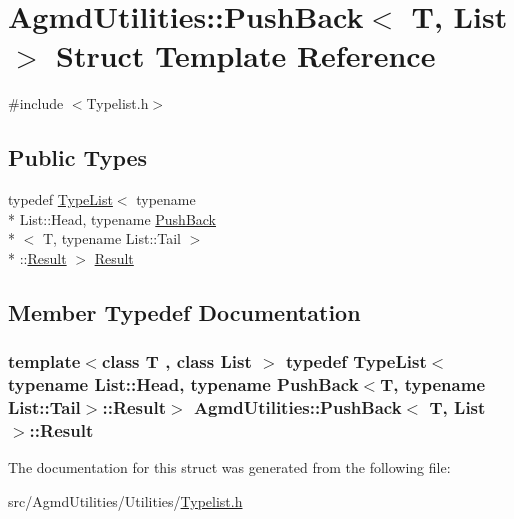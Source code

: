 \hypertarget{struct_agmd_utilities_1_1_push_back}{\section{Agmd\+Utilities\+:\+:Push\+Back$<$ T, List $>$ Struct Template Reference}
\label{struct_agmd_utilities_1_1_push_back}
}


{\ttfamily \#include $<$Typelist.\+h$>$}

\subsection*{Public Types}
\begin{DoxyCompactItemize}
\item 
typedef \hyperlink{struct_agmd_utilities_1_1_type_list}{Type\+List}$<$ typename \\*
List\+::\+Head, typename \hyperlink{struct_agmd_utilities_1_1_push_back}{Push\+Back}\\*
$<$ T, typename List\+::\+Tail $>$\\*
\+::\hyperlink{struct_agmd_utilities_1_1_push_back_a0666099f8f37a2888d92ee043aeb5deb}{Result} $>$ \hyperlink{struct_agmd_utilities_1_1_push_back_a0666099f8f37a2888d92ee043aeb5deb}{Result}
\end{DoxyCompactItemize}


\subsection{Member Typedef Documentation}
\hypertarget{struct_agmd_utilities_1_1_push_back_a0666099f8f37a2888d92ee043aeb5deb}{
\subsubsection[{Result}]{\setlength{\rightskip}{0pt plus 5cm}template$<$class T , class List $>$ typedef {\bf Type\+List}$<$typename List\+::\+Head, typename {\bf Push\+Back}$<$T, typename List\+::\+Tail$>$\+::{\bf Result}$>$ {\bf Agmd\+Utilities\+::\+Push\+Back}$<$ T, {\bf List} $>$\+::{\bf Result}}}\label{struct_agmd_utilities_1_1_push_back_a0666099f8f37a2888d92ee043aeb5deb}


The documentation for this struct was generated from the following file\+:\begin{DoxyCompactItemize}
\item 
src/\+Agmd\+Utilities/\+Utilities/\hyperlink{_typelist_8h}{Typelist.\+h}\end{DoxyCompactItemize}

